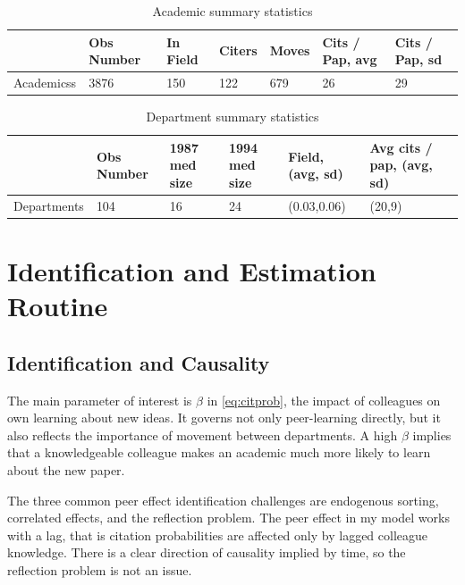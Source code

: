 \begin{table}[!ht]
    \centering
    \begin{tabular}{lllllll}
        \hline
                 & Obs Number & In Field & Citers & Moves & Cits / Pap, avg & Cits / Pap, sd \\ \hline \hline
        Academicss  & 3876       & 150      & 122    & 679   & 26              & 29             \\ \hline
    \end{tabular}
    \caption{Academic summary statistics}
    \label{tab:aut_sum}
\end{table}

\begin{table}[!ht]
    \centering
    \begin{tabular}{lllllll}
        \hline
                    & Obs Number & 1987 med size & 1994 med size & Field, (avg, sd) & Avg cits / pap, (avg, sd) \\ \hline\hline
        Departments & 104        & 16               & 24               & (0.03,0.06)           & (20,9) \\ \hline
    \end{tabular}
    \caption{Department summary statistics}
    \label{tab:dep_sum}
\end{table}

\section{Identification and Estimation Routine}

\subsection{Identification and Causality}
\label{sec:ident}

The main parameter of interest is $\beta$ in \eqref{eq:citprob}, the
impact of colleagues on own learning about new ideas. It
governs not only peer-learning directly, but it also reflects the importance 
of movement between departments.  A high $\beta$ implies that a knowledgeable
colleague makes an academic much more likely to learn about the new paper.

The three common peer effect identification challenges are endogenous sorting,
correlated effects, and the reflection problem.  The peer effect in my
model works with a lag, that is citation probabilities are affected only by 
lagged colleague knowledge.  There is a clear direction of 
causality implied by time, so the reflection problem is not an issue.

